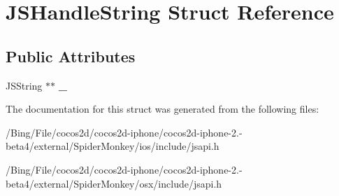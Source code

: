 \hypertarget{struct_j_s_handle_string}{\section{J\-S\-Handle\-String Struct Reference}
\label{struct_j_s_handle_string}
}
\subsection*{Public Attributes}
\begin{DoxyCompactItemize}
\item 
\hypertarget{struct_j_s_handle_string_a2418d6e094a5d0b00f50f16c1bf8b6a5}{J\-S\-String $\ast$$\ast$ {\bfseries \-\_\-}}\label{struct_j_s_handle_string_a2418d6e094a5d0b00f50f16c1bf8b6a5}

\end{DoxyCompactItemize}


The documentation for this struct was generated from the following files\-:\begin{DoxyCompactItemize}
\item 
/\-Bing/\-File/cocos2d/cocos2d-\/iphone/cocos2d-\/iphone-\/2.-\/beta4/external/\-Spider\-Monkey/ios/include/jsapi.\-h\item 
/\-Bing/\-File/cocos2d/cocos2d-\/iphone/cocos2d-\/iphone-\/2.-\/beta4/external/\-Spider\-Monkey/osx/include/jsapi.\-h\end{DoxyCompactItemize}
